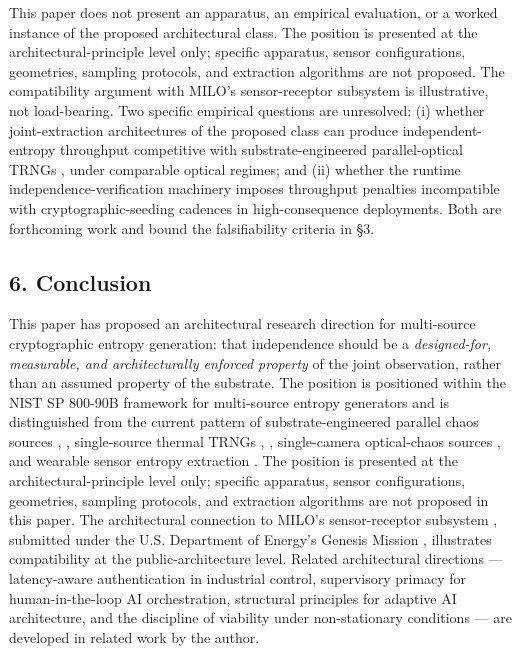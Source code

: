 This paper does not present an apparatus, an empirical evaluation, or a
worked instance of the proposed architectural class. The position is
presented at the architectural-principle level only; specific apparatus,
sensor configurations, geometries, sampling protocols, and extraction
algorithms are not proposed. The compatibility argument with MILO's
sensor-receptor subsystem \cite{ref8} is illustrative, not load-bearing. Two
specific empirical questions are unresolved: (i) whether
joint-extraction architectures of the proposed class can produce
independent-entropy throughput competitive with substrate-engineered
parallel-optical TRNGs \cite{ref5}, \cite{ref6} under comparable optical
regimes; and (ii) whether the runtime independence-verification
machinery imposes throughput penalties incompatible with
cryptographic-seeding cadences in high-consequence deployments. Both are
forthcoming work and bound the falsifiability criteria in §3.

\subsection{6. Conclusion}\label{conclusion}

This paper has proposed an architectural research direction for
multi-source cryptographic entropy generation: that independence should
be a \emph{designed-for, measurable, and architecturally enforced
property} of the joint observation, rather than an assumed property of
the substrate. The position is positioned within the NIST SP 800-90B
framework for multi-source entropy generators \cite{ref1} and is
distinguished from the current pattern of substrate-engineered parallel
chaos sources \cite{ref5}, \cite{ref6}, single-source thermal TRNGs \cite{ref2},
\cite{ref3}, single-camera optical-chaos sources \cite{ref4}, and wearable
sensor entropy extraction \cite{ref7}. The position is presented at the
architectural-principle level only; specific apparatus, sensor
configurations, geometries, sampling protocols, and extraction
algorithms are not proposed in this paper. The architectural connection
to MILO's sensor-receptor subsystem \cite{ref8}, submitted under the U.S.
Department of Energy's Genesis Mission \cite{ref9}, illustrates
compatibility at the public-architecture level. Related architectural
directions --- latency-aware authentication in industrial control,
supervisory primacy for human-in-the-loop AI orchestration, structural
principles for adaptive AI architecture, and the discipline of viability
under non-stationary conditions --- are developed in related work by the
author.

